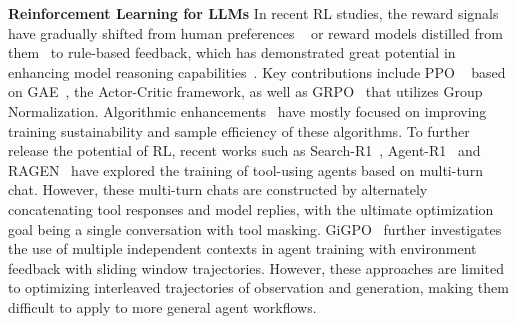 \textbf{Reinforcement Learning for LLMs} In recent RL studies, the reward signals have gradually shifted from human preferences ~\cite{NEURIPS2022_b1efde53} or reward models distilled from them~\cite{bai2022constitutional} to rule-based feedback, which has demonstrated great potential in enhancing model reasoning capabilities~\cite{o1, guo2025deepseek, qwq, gemini-thinking, k1.5}. Key contributions include PPO ~\cite{schulman2017proximal} based on GAE~\cite{schulman2018highdimensionalcontinuouscontrolusing},  the Actor-Critic framework, as well as GRPO~\cite{deepseekmath} that utilizes Group Normalization. Algorithmic enhancements~\cite{hu2025reinforce++, yu2025dapo, liu2025understanding} have mostly focused on improving training sustainability and sample efficiency of these algorithms. To further release the potential of RL, recent works such as Search-R1~\cite{jin2025search}, Agent-R1~\cite{Agent-R1} and RAGEN~\cite{ragen} have explored the training of tool-using agents based on multi-turn chat. However, these multi-turn chats are constructed by alternately concatenating tool responses and model replies, with the ultimate optimization goal being a single conversation with tool masking. GiGPO~\cite{feng2025group} further investigates the use of multiple independent contexts in agent training with environment feedback with sliding window trajectories. However, these approaches are limited to optimizing interleaved trajectories of observation and generation, making them difficult to apply to more general agent workflows.

